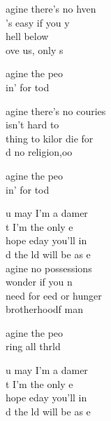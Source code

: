 \begin{cancion}%
	agine there's no hven\\
	's easy if you y\\
	 hell below  \\
	ove us, only s \jump\\
	\begin{chorus}%
		agine  the peo \\
		in' for tod \jump\\
	\end{chorus}%
	agine there's no couries\\
	 isn't hard to  \\
	thing to kilor die for\\
	d no religion,oo\jump\\
	\begin{chorus}%
		agine  the peo\chord{re}{m/Do}{ple   } \\
		in' for tod \jump\\
	\end{chorus}%
	u may  I'm a damer  \\
	t I'm  the only e   \\
	hope eday you'll in  \\
	d the ld will be as e\\
	\jump
	agine no possessions \\
	wonder if you n\\
	 need for eed or hunger\\
	brotherhoodf man\jump\\
	\begin{chorus}%
		agine  the peo \\
		ring all thrld\jump\\
	\end{chorus}%
	u may  I'm a damer  \\
	t I'm  the only e   \\
	hope eday you'll in  \\
	d the ld will be as e\\
\end{cancion}%
